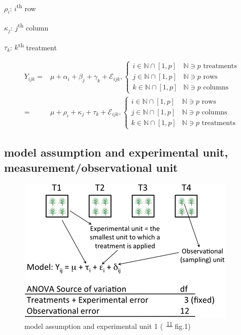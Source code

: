 \documentclass[
]{book}
\theoremstyle{definition}
\theoremstyle{definition}
\theoremstyle{definition}
\theoremstyle{definition}
\theoremstyle{remark}
\begin{document}
\(\rho_{{\scriptscriptstyle i}}\): \(i\)\textsuperscript{th} row

\(\kappa_{{\scriptscriptstyle j}}\): \(j\)\textsuperscript{th} column

\(\tau_{{\scriptscriptstyle k}}\): \(k\)\textsuperscript{th} treatment

\[
\begin{aligned}
Y_{{\scriptscriptstyle ijk}}= & \mu+\alpha_{{\scriptscriptstyle i}}+\beta_{{\scriptscriptstyle j}}+\gamma_{{\scriptscriptstyle k}}+\mathcal{E}_{{\scriptscriptstyle ijk}},\begin{cases}
i\in\mathbb{N}\cap\left[1,p\right] & \mathbb{N}\ni p\text{ treatments}\\
j\in\mathbb{N}\cap\left[1,p\right] & \mathbb{N}\ni p\text{ rows}\\
k\in\mathbb{N}\cap\left[1,p\right] & \mathbb{N}\ni p\text{ columns}
\end{cases}\\
= & \mu+\rho_{{\scriptscriptstyle i}}+\kappa_{{\scriptscriptstyle j}}+\tau_{{\scriptscriptstyle k}}+\mathcal{E}_{{\scriptscriptstyle ijk}},\begin{cases}
i\in\mathbb{N}\cap\left[1,p\right] & \mathbb{N}\ni p\text{ rows}\\
j\in\mathbb{N}\cap\left[1,p\right] & \mathbb{N}\ni p\text{ columns}\\
k\in\mathbb{N}\cap\left[1,p\right] & \mathbb{N}\ni p\text{ treatments}
\end{cases}
\end{aligned}
\]

\hypertarget{model-assumption-and-experimental-unit-measurementobservational-unit}{%
\subsection{model assumption and experimental unit, measurement/observational unit}\label{model-assumption-and-experimental-unit-measurementobservational-unit}}



\begin{figure}
\includegraphics[width=0.5\linewidth]{img/casler2015-fig1} \caption{model assumption and experimental unit 1 (~\textsuperscript{\protect\hyperlink{ref-casler2015}{11}} fig.1)}\label{fig:unnamed-chunk-3}
\end{figure}
\end{document}
